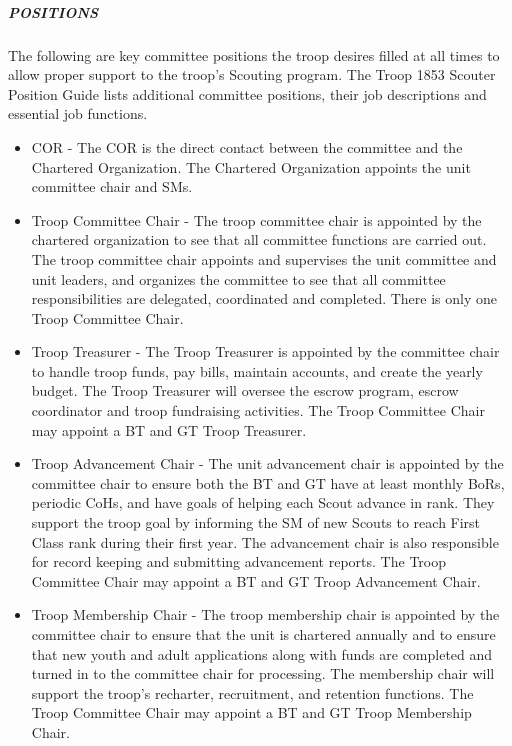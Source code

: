 \documentclass{ltxguide}
\begin{document}
\subparagraph{POSITIONS}
The following are key committee positions the troop desires filled at all times to allow proper support to the troop's Scouting program. The Troop 1853 Scouter Position Guide lists additional committee positions, their job descriptions and essential job functions.

\begin{itemize}
	\item \ac{COR} - The \ac{COR} is the direct contact between the committee and the Chartered Organization. The Chartered Organization appoints the unit committee chair and \acp{SM}.

	\item Troop Committee Chair - The troop committee chair is appointed by the chartered organization to see that all committee functions are carried out. The troop committee chair appoints and supervises the unit committee and unit leaders, and organizes the committee to see that all committee responsibilities are delegated, coordinated and completed. There is only one Troop Committee Chair.

	\item Troop Treasurer - The Troop Treasurer is appointed by the committee chair to handle troop funds, pay bills, maintain accounts, and create the yearly budget. The Troop Treasurer will oversee the escrow program, escrow coordinator and troop fundraising activities. The Troop Committee Chair may appoint a \ac{BT} and \ac{GT} Troop Treasurer.

	\item Troop Advancement Chair - The unit advancement chair is appointed by the committee chair to ensure both the \ac{BT} and \ac{GT} have at least monthly \acp{BoR}, periodic \acp{CoH}, and have goals of helping each Scout advance in rank. They support the troop goal by informing the \ac{SM} of new Scouts to reach First Class rank during their first year. The advancement chair is also responsible for record keeping and submitting advancement reports. The Troop Committee Chair may appoint a \ac{BT} and \ac{GT} Troop Advancement Chair.

	\item Troop Membership Chair - The troop membership chair is appointed by the committee chair to ensure that the unit is chartered annually and to ensure that new youth and adult applications along with funds are completed and turned in to the committee chair for processing. The membership chair will support the troop's recharter, recruitment, and retention functions. The Troop Committee Chair may appoint a \ac{BT} and \ac{GT} Troop Membership Chair.


\end{itemize}
\end{document}
